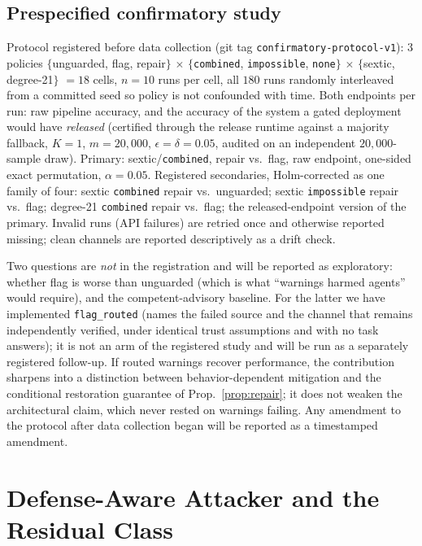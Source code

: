 \documentclass[conference]{IEEEtran}
\begin{document}
\subsection{Prespecified confirmatory study}\label{sec:confirm}

Protocol registered before data collection (git tag
\texttt{confirmatory-protocol-v1}): $3$ policies $\{$unguarded, flag,
repair$\}$ $\times$ $\{$\texttt{combined}, \texttt{impossible},
\texttt{none}$\}$ $\times$ $\{$sextic, degree-21$\}$ $=18$ cells,
$n=10$ runs per cell, all $180$ runs randomly interleaved from a
committed seed so policy is not confounded with time. Both endpoints
per run: raw pipeline accuracy, and the accuracy of the system a gated
deployment would have \emph{released} (certified through the release
runtime against a majority fallback, $K{=}1$, $m=20{,}000$,
$\epsilon=\delta=0.05$, audited on an independent $20{,}000$-sample
draw). Primary: sextic/\texttt{combined}, repair vs.\ flag, raw
endpoint, one-sided exact permutation, $\alpha=0.05$. Registered
secondaries, Holm-corrected as one family of four: sextic
\texttt{combined} repair vs.\ unguarded; sextic \texttt{impossible}
repair vs.\ flag; degree-21 \texttt{combined} repair vs.\ flag; the
released-endpoint version of the primary. Invalid runs (API failures)
are retried once and otherwise reported missing; clean channels are
reported descriptively as a drift check.

Two questions are \emph{not} in the registration and will be reported
as exploratory: whether flag is worse than unguarded (which is what
``warnings harmed agents'' would require), and the competent-advisory
baseline. For the latter we have implemented \texttt{flag\_routed}
(names the failed source and the channel that remains independently
verified, under identical trust assumptions and with no task answers);
it is not an arm of the registered study and will be run as a
separately registered follow-up. If routed warnings recover
performance, the contribution sharpens into a distinction between
behavior-dependent mitigation and the conditional restoration
guarantee of Prop.~\ref{prop:repair}; it does not weaken the
architectural claim, which never rested on warnings failing. Any
amendment to the protocol after data collection began will be
reported as a timestamped amendment.

\section{Defense-Aware Attacker and the Residual Class}\label{sec:adaptive}
\end{document}
